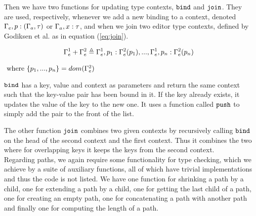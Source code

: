 Then we have two functions for updating type contexts, $\texttt{bind}$ and
$\texttt{join}$. They are used, respectively, whenever we add a new binding to a
context, denoted $\Gamma_{e},p : (\Gamma_{a},\tau)$ or
$\Gamma_{a},x : \tau$, and when we join two editor type contexts, defined by
Godiksen et al. as in equation (\ref{eq:join}).\pepm

\begin{equation}\label{eq:join}
  \Gamma_{e}^1 + \Gamma_{e}^2 \triangleq \Gamma_{e}^1,p_1 : \Gamma_{e}^2(p_1),...,\Gamma_{e}^1,p_n : \Gamma_{e}^2(p_n)
\end{equation}
\begin{center}
  $\text{ where } \{p_1,...,p_n\} = dom(\Gamma_{e}^2)$~~~~~~~~~~~~~~~~~~~~~~~~~~
\end{center}

$\texttt{bind}$ has a key, value and context as parameters and return the same
context such that the key-value pair has been bound in it. If the key already
exists, it updates the value of the key to the new one. It uses a function
called $\texttt{push}$ to simply add the pair to the front of the list.

The other function $\texttt{join}$ combines two given contexts by recursively
calling $\texttt{bind}$ on the head of the second context and the first context.
Thus it combines the two where for overlapping keys it keeps the keys from the
second context. \\

Regarding paths, we again require some functionality for type checking, which
we achieve by a suite of auxiliary functions, all of which have trivial
implementations and thus the code is not listed. We have one function for
shrinking a path by a child, one for extending a path by a child, one for
getting the last child of a path, one for creating an empty path, one for
concatenating a path with another path and finally one for computing the length
of a path.

